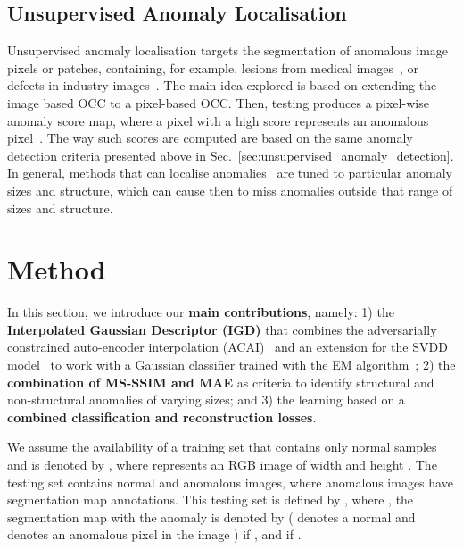 \documentclass[final]{cvpr}
\begin{document}
\subsection{Unsupervised Anomaly Localisation} 
\label{sec:unsupervised_anomaly_localisation}

Unsupervised anomaly localisation targets the segmentation of anomalous image pixels or patches, containing, for example, lesions from medical images~\cite{Li_2019_CVPR,liu2019photoshopping}, or defects in industry images~\cite{mvtecad,bergmann2020uninformed}.
The main idea explored is based on extending the image based OCC to a pixel-based OCC.
Then, testing produces a pixel-wise anomaly score map, where a pixel with a high score represents an anomalous pixel~\cite{akcay2018ganomaly,baur2018deep,ae-ssim,ravanbakhsh2019training,anogan}. 
The way such scores are computed are based on the same anomaly detection criteria presented above in Sec.~\ref{sec:unsupervised_anomaly_detection}.
In general, methods that can localise anomalies~\cite{f-anogan, venkataramanan2019attention, bergmann2020uninformed} are tuned to particular anomaly sizes and structure, which can cause then to miss anomalies outside that range of sizes and structure.  






\section{Method}

In this section, we introduce our \textbf{main contributions}, namely: 1) the 
\textbf{Interpolated Gaussian Descriptor (IGD)} that combines the adversarially constrained auto-encoder interpolation (ACAI)~\cite{berthelot2018understanding} and an extension for the SVDD model~\cite{svdd} to work with a Gaussian classifier trained with the EM algorithm~\cite{dempster1977maximum};  2) the \textbf{combination of MS-SSIM  and MAE} as criteria to identify structural and non-structural anomalies of varying sizes;
and 3) the learning based on a \textbf{combined classification and reconstruction losses}.








We assume the availability of a
training set that contains only normal samples and is denoted by , where  represents an RGB image of width  and height .  The testing set contains normal and anomalous images, where anomalous images have segmentation map annotations.  This testing set is defined by
, where , the segmentation map 
with the anomaly is denoted by  ( denotes a normal and  denotes an anomalous pixel in the image ) if , and  if .
\end{document}
